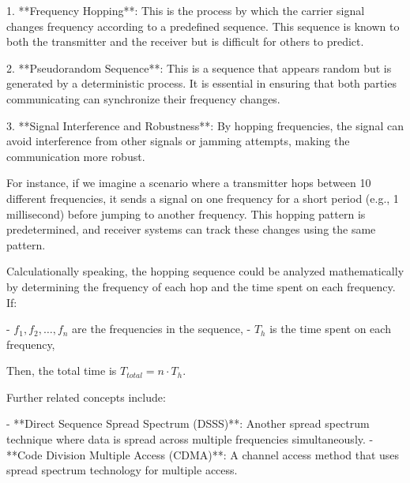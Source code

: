 1. **Frequency Hopping**: This is the process by which the carrier signal changes frequency according to a predefined sequence. This sequence is known to both the transmitter and the receiver but is difficult for others to predict.

2. **Pseudorandom Sequence**: This is a sequence that appears random but is generated by a deterministic process. It is essential in ensuring that both parties communicating can synchronize their frequency changes.

3. **Signal Interference and Robustness**: By hopping frequencies, the signal can avoid interference from other signals or jamming attempts, making the communication more robust.

For instance, if we imagine a scenario where a transmitter hops between 10 different frequencies, it sends a signal on one frequency for a short period (e.g., 1 millisecond) before jumping to another frequency. This hopping pattern is predetermined, and receiver systems can track these changes using the same pattern.

Calculationally speaking, the hopping sequence could be analyzed mathematically by determining the frequency of each hop and the time spent on each frequency. If:

- \(f_1, f_2, \ldots, f_n\) are the frequencies in the sequence,
- \(T_h\) is the time spent on each frequency,

Then, the total time is \(T_{total} = n \cdot T_h\).

Further related concepts include:

- **Direct Sequence Spread Spectrum (DSSS)**: Another spread spectrum technique where data is spread across multiple frequencies simultaneously.
- **Code Division Multiple Access (CDMA)**: A channel access method that uses spread spectrum technology for multiple access.

